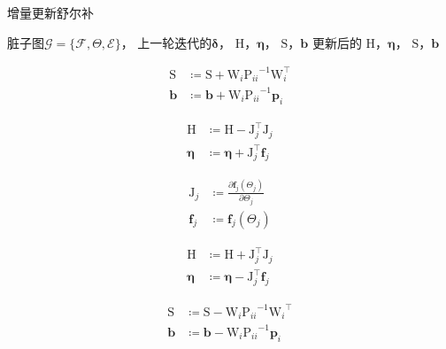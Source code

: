 \begin{algorithm}
\caption{增量更新舒尔补}
\begin{algorithmic}
    \Require 脏子图$\mathcal{G}=\{\mathcal{F},\Theta,\mathcal{E}\}$，
             上一轮迭代的$\bm{\delta}$，
             $\mathrm{H}$，$\bm{\eta}$，
             $\mathrm{S}$，$\bm{b}$
    \Ensure 更新后的
            $\mathrm{H}$，$\bm{\eta}$，
            $\mathrm{S}$，$\bm{b}$

        \[\begin{aligned}
                \mathrm{S} &\coloneqq \mathrm{S} + \mathrm{W}_i{\mathrm{P}_{ii}}^{-1}\mathrm{W}_i^\top \\
                \bm{b}     &\coloneqq \bm{b}     + \mathrm{W}_i{\mathrm{P}_{ii}}^{-1}\bm{p}_i
        \end{aligned}\]
    \EndFor

        \[\begin{aligned}
                \mathrm{H} &\coloneqq \mathrm{H} - \mathrm{J}_j^\top \mathrm{J}_j \\
                \bm{\eta}  &\coloneqq \bm{\eta} + \mathrm{J}_j^\top \bm{f}_j
        \end{aligned}\]

        \[\begin{aligned}
                \mathrm{J}_j &\coloneqq \frac{\partial{\bm{f}_j(\Theta_j)}}
                                             {\partial{\Theta_j}} \\
                \bm{f}_j     &\coloneqq \bm{f}_j(\Theta_j)
        \end{aligned}\]

        \[\begin{aligned}
                \mathrm{H} &\coloneqq \mathrm{H} + \mathrm{J}_j^\top\mathrm{J}_j \\
                \bm{\eta}  &\coloneqq \bm{\eta}  - \mathrm{J}_j^\top\bm{f}_j
        \end{aligned}\]
    \EndFor

        \[\begin{aligned}
                \mathrm{S} &\coloneqq \mathrm{S} - \mathrm{W}_i{\mathrm{P}_{ii}}^{-1}{\mathrm{W}_i}^\top \\
                \bm{b}     &\coloneqq \bm{b}     - \mathrm{W}_i{\mathrm{P}_{ii}}^{-1}\bm{p}_i
        \end{aligned}\]
    \EndFor

\end{algorithmic}
\label{alg:schur_update}
\end{algorithm}
